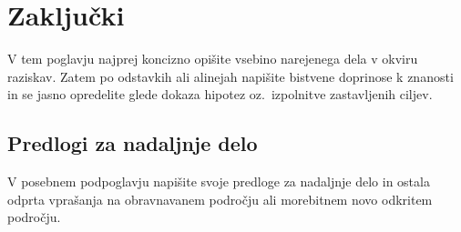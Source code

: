 \chapter{Zaključki}\label{cha:zakljucki}
V tem poglavju najprej koncizno opišite vsebino narejenega dela v okviru raziskav. Zatem po odstavkih ali alinejah napišite bistvene doprinose k znanosti in se jasno opredelite glede dokaza hipotez oz.~izpolnitve zastavljenih ciljev.

\section{Predlogi za nadaljnje delo}\label{sec:nadaljnje_delo}
V posebnem podpoglavju napišite svoje predloge za nadaljnje delo in ostala odprta vprašanja na obravnavanem področju ali morebitnem novo odkritem področju.
